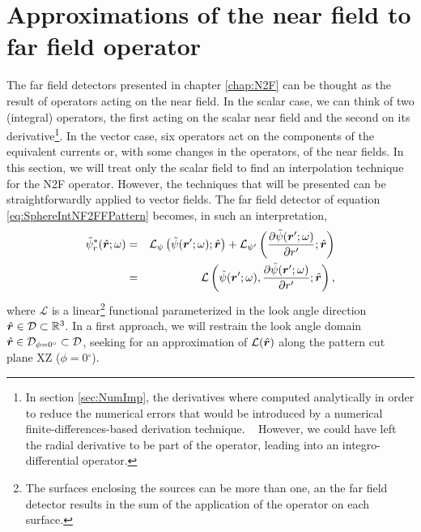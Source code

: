 \section{Approximations of the near field to far field operator}

\par The far field detectors presented in chapter \ref{chap:N2F} can be thought as the result of operators \cite{RudinFA, GiaquintaModicaMA} acting on the near field. In the scalar case, we can think of two (integral) operators, the first acting on the scalar near field and the second on its derivative\footnote{In section \ref{sec:NumImp}, the derivatives where computed analytically in order to reduce the numerical errors that would be introduced by a numerical finite-differences-based derivation technique. ~ However, we could have left the radial derivative to be part of the operator, leading into an integro-differential operator.}. In the vector case, six operators act on the components of the equivalent currents or, with some changes in the operators, of the near fields. In this section, we will treat only the scalar field to find an interpolation technique for the N2F operator. However, the techniques that will be presented can be straightforwardly applied to vector fields. The far field detector of equation \eqref{eq:SphereIntNF2FFPattern} becomes, in such an interpretation,
\begin{eqnarray}
\label{eq:Operator}
\tilde{\psi}_r^* (\hat{\mbfit{r}}; \omega) & = &\mathcal{L}_{\psi} \left (\tilde{\psi}(\mbfit{r'}; \omega)  ; \hat{\mbfit{r}} \right ) + \mathcal{L}_{\psi{'}} \left ( \frac{\partial{\tilde{\psi}(\mbfit{r'}; \omega)}}{\partial{r'}}  ; \hat{\mbfit{r}} \right )  \nonumber \\
& = & \mathcal{L} \left ( \tilde{\psi}(\mbfit{r'}; \omega) , \frac{\partial{\tilde{\psi}(\mbfit{r'}; \omega)}}{\partial{r'}} ; \hat{\mbfit{r}} \right ),
\end{eqnarray} where $\mathcal{L}$ is a linear\footnote{The surfaces enclosing the sources can be more than one, an the far field detector results in the sum of the application of the operator on each surface.} functional parameterized in the look angle direction $\hat{\mbfit{r}} \in \mathcal{D} \subset \mathbb{R}^3$. In a first approach, we will restrain the look angle domain $\hat{\mbfit{r}} \in \mathcal{D}_{\phi = 0\ensuremath{^\circ}} \subset \mathcal{D}$, seeking for an approximation of $\mathcal{L}(\hat{\mbfit{r}})$ along the pattern cut plane XZ ($\phi = 0\ensuremath{^\circ}$).

